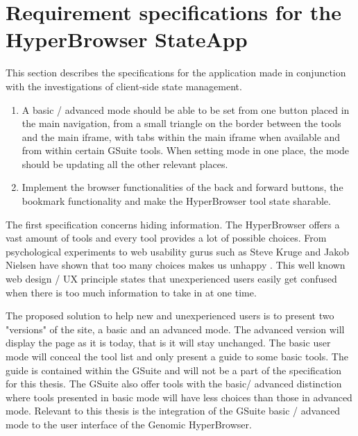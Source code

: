 \documentclass[english]{ifimaster}
\begin{document}

\section{Requirement specifications for the HyperBrowser StateApp}
This section describes the specifications for the application made in conjunction with the investigations of client-side state management.
\begin{enumerate}
\item A basic / advanced mode should be able to be set from one button placed in the main navigation, from a small triangle on the border between the tools and the main iframe, with tabs within the main iframe when available and from within certain GSuite tools. When setting mode in one place, the mode should be updating all the other relevant places.

\item Implement the browser functionalities of the back and forward buttons, the bookmark functionality and make the HyperBrowser tool state sharable. 

\end{enumerate}

The first specification concerns hiding information. The HyperBrowser offers a vast amount of tools and every tool provides a lot of possible choices. From psychological experiments to web usability gurus such as Steve Kruge and Jakob Nielsen have shown that too many choices makes us unhappy \parencite{schwartz2004paradox}  \parencite{krug2005don}  \parencite{nielsen1997user}. This well known web design / UX principle states that unexperienced users easily get confused when there is too much information to take in at one time.

The proposed solution to help new and unexperienced users is to present two "versions" of the site, a basic and an advanced mode. The advanced version will display the page as it is today, that is it will stay unchanged. The basic user mode will conceal the tool list and only present a guide to some basic tools. The guide is contained within the GSuite and will not be a part of the specification for this thesis. The GSuite also offer tools with the basic/ advanced distinction where tools presented in basic mode will have less choices than those in advanced mode. 
Relevant to this thesis is the integration of the GSuite basic / advanced mode to the user interface of the Genomic HyperBrowser. 
\end{document}
